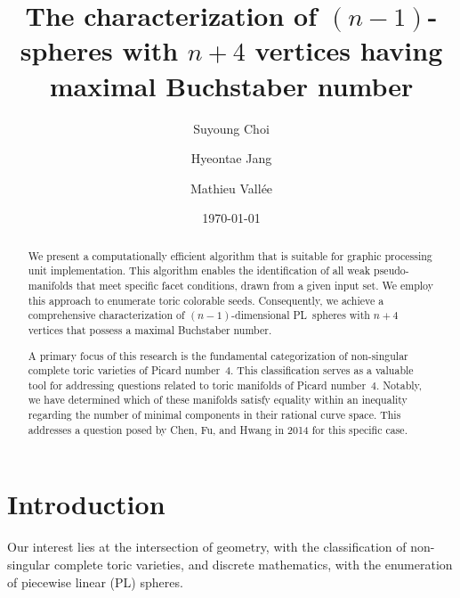 \documentclass[11pt]{amsart}
\title[Toric colorable PL~spheres of Picard number~$4$]
{The characterization of $(n-1)$-spheres with $n+4$ vertices having maximal Buchstaber number}
\author{Suyoung Choi}
\author{Hyeontae Jang}
\author{Mathieu Vall\'ee}
\date{\today}
\theoremstyle{plain}
\numberwithin{equation}{section}
\theoremstyle{definition}
\begin{document}
\begin{abstract}
    We present a computationally efficient algorithm that is suitable for graphic processing unit implementation. This algorithm enables the identification of all weak pseudo-manifolds that meet specific facet conditions, drawn from a given input set. We employ this approach to enumerate toric colorable seeds. Consequently, we achieve a comprehensive characterization of $(n-1)$-dimensional PL~spheres with $n+4$ vertices that possess a maximal Buchstaber number.

    A primary focus of this research is the fundamental categorization of non-singular complete toric varieties of Picard number~$4$.
    This classification serves as a valuable tool for addressing questions related to toric manifolds of Picard number~$4$.
    Notably, we have determined which of these manifolds satisfy equality within an inequality regarding the number of minimal components in their rational curve space.
    This addresses a question posed by Chen, Fu, and Hwang in 2014 for this specific case.
\end{abstract}
{\let\newpage\relax\maketitle}

\section{Introduction}
Our interest lies at the intersection of geometry, with the classification of non-singular complete toric varieties, and discrete mathematics, with the enumeration of piecewise linear (PL) spheres.
\end{document}
